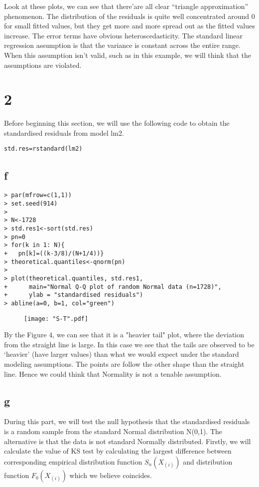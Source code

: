 \documentclass[12pt]{article}
\begin{document}
\noindent
Look at these plots, we can see that there’are all clear “triangle approximation” phenomenon. The distribution of the residuals is quite well concentrated around 0 for small fitted values, but they get more and more spread out as the fitted values increase. The error terms have obvious heteroscedasticity. The standard linear regression assumption is that the variance is constant across the entire range. When this assumption isn’t valid, such as in this example, we will think that the assumptions are violated.

\section{2}
Before beginning this section, we will use the following code to obtain the standardised residuals from model lm2.
\begin{verbatim}
std.res=rstandard(lm2)

\end{verbatim}

\subsection{f}
\begin{verbatim}
> par(mfrow=c(1,1))
> set.seed(914)
> 
> N<-1728
> std.res1<-sort(std.res)
> pn=0
> for(k in 1: N){
+   pn[k]=((k-3/8)/(N+1/4))}  
> theoretical.quantiles<-qnorm(pn)
> 
> plot(theoretical.quantiles, std.res1,  
+      main="Normal Q-Q plot of random Normal data (n=1728)",
+      ylab = "standardised residuals")
> abline(a=0, b=1, col="green")
\end{verbatim}

\begin{figure}[!htb]
	\centering
	\texttt{[image: "S-T".pdf]} 
	\caption{}
\end{figure}

\noindent
By the Figure 4, we can see that it is a "heavier tail" plot, where the deviation from the straight line is large. In this case we see that the tails are observed to be ‘heavier’ (have larger values) than what we would expect under the standard modeling assumptions. The points are follow the other shape than the straight line. Hence we could think that Normality is not a tenable assumption.

\subsection{g}
During this part, we will test the null hypothesis that the standardised residuals is a random
sample from the standard Normal distribution N(0,1). The alternative is that the data is not standard Normally distributed.
Firstly, we will calculate the value of KS test by calculating the largest difference between corresponding empirical distribution function $S_n(X_{(i)})$ and distribution function $F_0(X_{(i)})$ which we believe coincides.
\end{document}
